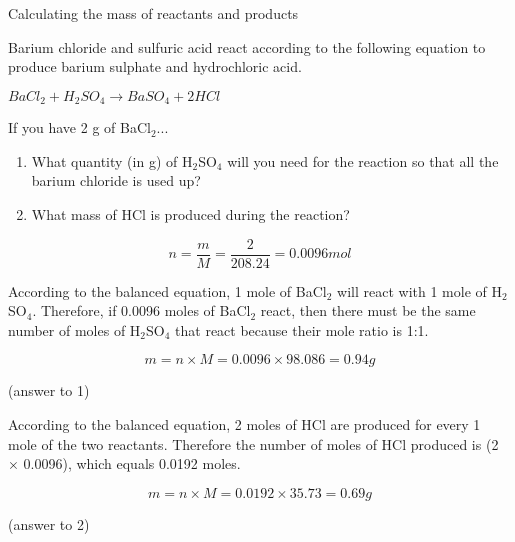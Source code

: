 \begin{wex}{Calculating the mass of reactants and products}{Barium chloride and sulfuric acid react according to the following equation to produce barium sulphate and hydrochloric acid.
\begin{center}
\rm${BaCl_{2} + H_{2}SO_{4} \rightarrow BaSO_{4} + 2HCl}$ 
\end{center}

If you have 2 g of BaCl$_{2}$...

\begin{enumerate}
\item{What quantity (in g) of H$_{2}$SO$_{4}$ will you need for the reaction so that all the barium chloride is used up?}
\item{What mass of HCl is produced during the reaction?}
\end{enumerate}
}

{
\begin{equation*}
n = \frac{m}{M} = \frac{2}{208.24} = 0.0096 mol
\end{equation*}
}

{
According to the balanced equation, 1 mole of BaCl$_{2}$ will react with 1 mole of H$_{2}$SO$_{4}$. Therefore, if 0.0096 moles of BaCl$_{2}$ react, then there must be the same number of moles of H$_{2}$SO$_{4}$ that react because their mole ratio is 1:1.\\
}

{

\begin{equation*}
m = n \times M = 0.0096 \times 98.086 = 0.94 g
\end{equation*}

(answer to 1)\\
}

{
According to the balanced equation, 2 moles of HCl are produced for every 1 mole of the two reactants. Therefore the number of moles of HCl produced is (2 $\times$ 0.0096), which equals 0.0192 moles. \\
}

{

\begin{equation*}
m = n \times M = 0.0192 \times 35.73 = 0.69 g
\end{equation*}

(answer to 2)
}
\end{wex}

